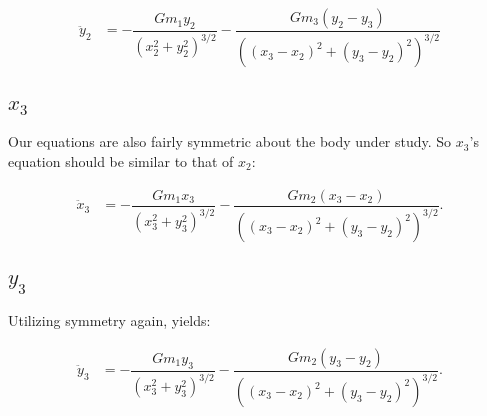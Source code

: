 \documentclass[12pt,a4paper,portrait]{article}
\begin{document}
	\begin{align*}
		\ddot{y}_2 &= -\dfrac{Gm_1y_2}{\left(x_2^2+y_2^2\right)^{3/2}} -\dfrac{Gm_3(y_2-y_3)}{\left((x_3-x_2)^2+(y_3-y_2)^2\right)^{3/2}}
	\end{align*}
	
	\subsection{$x_3$}
	Our equations are also fairly symmetric about the body under study. So $x_3$'s equation should be similar to that of $x_2$:
	
	\begin{align*}
		\ddot{x}_3 &= -\dfrac{Gm_1x_3}{\left(x_3^2+y_3^2\right)^{3/2}} -\dfrac{Gm_2(x_3-x_2)}{\left((x_3-x_2)^2+(y_3-y_2)^2\right)^{3/2}}.
	\end{align*}
	
	\subsection{$y_3$}
	Utilizing symmetry again, yields:
	
	\begin{align*}
		\ddot{y}_3 &= -\dfrac{Gm_1y_3}{\left(x_3^2+y_3^2\right)^{3/2}} -\dfrac{Gm_2(y_3-y_2)}{\left((x_3-x_2)^2+(y_3-y_2)^2\right)^{3/2}}.
	\end{align*}
\end{document}
